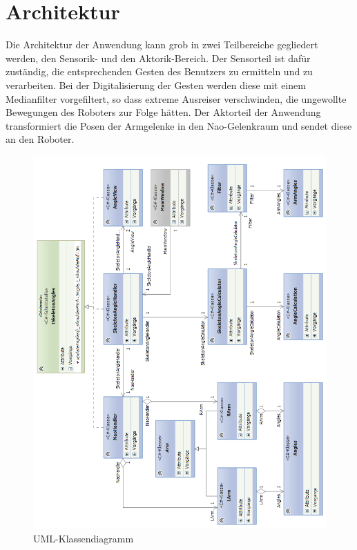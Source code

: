 %
%
\section{Architektur}\label{k:Architektur}
Die Architektur der Anwendung kann grob in zwei Teilbereiche gegliedert werden, den Sensorik- und den Aktorik-Bereich.
Der Sensorteil ist dafür zuständig, die entsprechenden Gesten des Benutzers zu ermitteln und zu verarbeiten. Bei der Digitalisierung der Gesten werden diese mit einem Medianfilter vorgefiltert, so dass extreme Ausreiser verschwinden, die ungewollte Bewegungen des Roboters zur Folge hätten.
Der Aktorteil der Anwendung transformiert die Posen der Armgelenke in den Nao-Gelenkraum und sendet diese an den Roboter.

%
%
%


\begin{figure}[H]						
	\centering							
	\includegraphics[scale=0.8]{Bilder/classdiagramm.png}
	\caption{UML-Klassendiagramm}						
	\label{f:classdiagramm}						
\end{figure}

